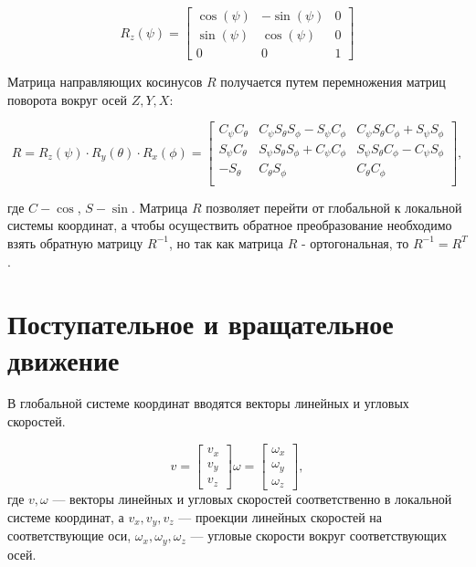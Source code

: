 \begin{equation}
R_z(\psi) = \begin{bmatrix}
    \cos(\psi) & -\sin(\psi) & 0 \\
    \sin(\psi) & \cos(\psi) & 0 \\
    0 & 0 & 1
\end{bmatrix}
\end{equation}


Матрица направляющих косинусов \(R\) получается путем перемножения матриц поворота вокруг осей \(Z, Y, X\):

\begin{equation}
R = R_z(\psi) \cdot R_y(\theta) \cdot R_x(\phi) =
\begin{bmatrix}
C_{\psi} C_{\theta} & C_{\psi} S_{\theta} S_{\phi} - S_{\psi} C_{\phi} & C_{\psi} S_{\theta} C_{\phi} + S_{\psi} S_{\phi} \\
S_{\psi} C_{\theta} & S_{\psi} S_{\theta} S_{\phi} + C_{\psi} C_{\phi} & S_{\psi} S_{\theta} C_{\phi} - C_{\psi} S_{\phi} \\
-S_{\theta} & C_{\theta} S_{\phi} & C_{\theta} C_{\phi} \\
\end{bmatrix},
\end{equation}

где \( C - \cos\), \(S - \sin \). Матрица \(R\) позволяет перейти от глобальной к локальной системы координат, а чтобы
осуществить обратное преобразование необходимо взять обратную матрицу \(R^{-1}\), но так как матрица \(R\) - 
ортогональная, то \(R^{-1}=R^T\).

\section{Поступательное и вращательное движение}

В глобальной системе координат вводятся векторы линейных и угловых скоростей.

\begin{equation}
v = 
\begin{bmatrix}
    v_x \\ v_y \\ v_z
\end{bmatrix}
\omega = 
\begin{bmatrix}
    \omega_x \\ \omega_y \\ \omega_z
\end{bmatrix},
\end{equation}
где \(v, \omega\) --- векторы линейных и угловых скоростей соответственно в локальной системе координат, а 
\(v_x, v_y, v_z\) --- проекции линейных скоростей на соответствующие оси, 
\( \omega_x, \omega_y, \omega_z\) --- угловые скорости вокруг соответствующих осей.

